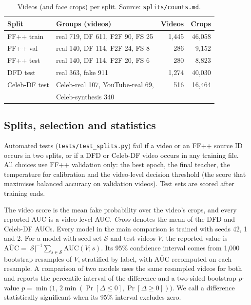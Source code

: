 \documentclass[conference]{IEEEtran}
\begin{document}
\begin{table}[t]
\centering\footnotesize
\caption{Videos (and face crops) per split. Source: \texttt{splits/counts.md}.}
\label{tab:data}
\begin{tabular}{llrr}
\toprule
Split & Groups (videos) & Videos & Crops \\
\midrule
FF++ train & real 719, DF 611, F2F 90, FS 25 & 1,445 & 46,058 \\
FF++ val & real 140, DF 114, F2F 24, FS 8 & 286 & 9,152 \\
FF++ test & real 140, DF 114, F2F 20, FS 6 & 280 & 8,823 \\
DFD test & real 363, fake 911 & 1,274 & 40,030 \\
Celeb-DF test & Celeb-real 107, YouTube-real 69, & 516 & 16,464 \\
 & Celeb-synthesis 340 & & \\
\bottomrule
\end{tabular}
\end{table}

\subsection{Splits, selection and statistics}
Automated tests (\texttt{tests/test\_splits.py}) fail if a video or an FF++ source ID occurs in two splits, or if a
DFD or Celeb-DF video occurs in any training file. All choices use FF++ validation only: the best epoch, the final
teacher, the temperature for calibration and the video-level decision threshold (the score that maximises balanced
accuracy on validation videos). Test sets are scored after training ends.

The video score is the mean fake probability over the video's crops, and every reported AUC is a video-level AUC.
\emph{Cross} denotes the mean of the DFD and Celeb-DF AUCs. Every model in the main comparison is trained with
seeds 42, 1 and 2. For a model with seed set $\mathcal{S}$ and test videos $V$, the reported value is
$\overline{\mathrm{AUC}} = |\mathcal{S}|^{-1}\sum_{s\in\mathcal{S}}\mathrm{AUC}(V; s)$. Its 95\% confidence
interval comes from 1,000 bootstrap resamples of $V$, stratified by label, with $\overline{\mathrm{AUC}}$
recomputed on each resample. A comparison of two models uses the same resampled videos for both and reports the
percentile interval of the difference and a two-sided bootstrap $p$-value
$p = \min\!\bigl(1,\,2\min(\Pr[\Delta\le 0],\Pr[\Delta\ge 0])\bigr)$. We call a difference statistically
significant when its 95\% interval excludes zero.
\end{document}
